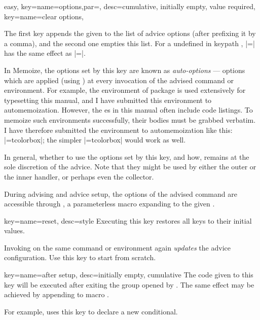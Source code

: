 \documentclass[a4paper,11pt]{article}
\begin{document}
\begin{doc}{easy,
    key={name=options,par=,
      desc={cumulative, initially empty, value required}},
    key={name=clear options},
  }

  The first key appends the given  to the list of advice options
  (after prefixing it by a comma), and the second one empties this list.  For a
   undefined in keypath ,
  |=| has the same effect as
  |=|.

  In Memoize, the options set by this key are known as
  \emph{auto-options} --- options which are applied (using ) at
  every invocation of the advised command or environment.  For example, the
   environment of package  is used extensively
  for typesetting this manual, and I have submitted this environment to
  automemoization.  However, the es in this manual often include
  code listings.  To memoize such environments successfully, their bodies must
  be grabbed verbatim.  I have therefore submitted the 
  environment to automemoization like this:
  |={tcolorbox}|; the simpler
  |={tcolorbox}|
  would work as well.

  In general, whether to use the options set by this key, and how, remains at
  the sole discretion of the advice.  Note that they might be used by either
  the outer or the inner handler, or perhaps even the collector.
  
  During advising and advice setup, the options of the advised command are
  accessible through , a parameterless macro expanding
  to the given .
\end{doc}

\begin{doc}{key={name=reset, desc=style}}
  Executing this key restores all  keys to their initial values.

  Invoking  on the same command or environment again
  \emph{updates} the advice configuration.  Use this key to start from scratch.
\end{doc}

\begin{doc}{key={name=after setup, desc={initially empty, cumulative}}}
  The code given to this key will be executed after exiting the group opened by
  .  The same effect may be achieved by appending to macro
  .

  For example,  uses this key to declare a new
  conditional.
\end{doc}
\end{document}
